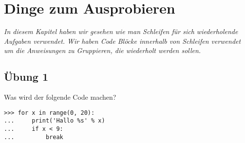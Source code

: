\section{Dinge zum Ausprobieren}

\emph{In diesem Kapitel haben wir gesehen wie man Schleifen für sich wiederholende Aufgaben verwendet. Wir haben Code Blöcke innerhalb von Schleifen verwendet um die Anweisungen zu Gruppieren, die wiederholt werden sollen.}

\subsection*{Übung 1}
Was wird der folgende Code machen?

\begin{listing}
\begin{verbatim}
>>> for x in range(0, 20):
...     print('Hallo %s' % x)
...     if x < 9:
...         break
\end{verbatim}
\end{listing}



